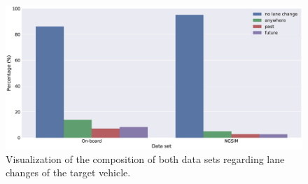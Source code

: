 \begin{figure}[t]
    \centering
    \includegraphics[width=1.\linewidth]{imgs/data_set_lane_change_distribution.eps}
    \caption{Visualization of the composition of both data sets regarding lane changes of the target vehicle.}
    \label{fig:data_set_lane_change_distribution}
\end{figure}

